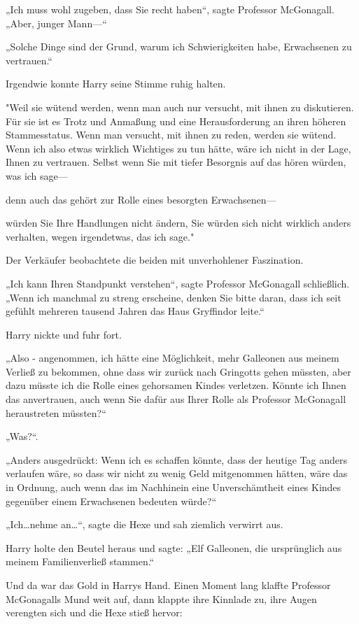 {„Ich muss wohl zugeben, dass Sie recht haben“, sagte Professor McGonagall. „Aber, junger Mann—“

„Solche Dinge sind der Grund, warum ich Schwierigkeiten habe, Erwachsenen zu vertrauen.“

Irgendwie konnte Harry seine Stimme ruhig halten.

"Weil sie wütend werden, wenn man auch nur versucht, mit ihnen zu diskutieren. Für sie ist es Trotz und Anmaßung und eine Herausforderung an ihren höheren Stammesstatus. Wenn man versucht, mit ihnen zu reden, werden sie wütend. Wenn ich also etwas wirklich Wichtiges zu tun hätte, wäre ich nicht in der Lage, Ihnen zu vertrauen. Selbst wenn Sie mit tiefer Besorgnis auf das hören würden, was ich sage—

denn auch das gehört zur Rolle eines besorgten Erwachsenen—

würden Sie Ihre Handlungen nicht ändern, Sie würden sich nicht wirklich anders verhalten, wegen irgendetwas, das ich sage."

Der Verkäufer beobachtete die beiden mit unverhohlener Faszination.

„Ich kann Ihren Standpunkt verstehen“, sagte Professor McGonagall schließlich. „Wenn ich manchmal zu streng erscheine, denken Sie bitte daran, dass ich seit gefühlt mehreren tausend Jahren das Haus Gryffindor leite.“

Harry nickte und fuhr fort.

„Also - angenommen, ich hätte eine Möglichkeit, mehr Galleonen aus meinem Verließ zu bekommen, ohne dass wir zurück nach Gringotts gehen müssten, aber dazu müsste ich die Rolle eines gehorsamen Kindes verletzen. Könnte ich Ihnen das anvertrauen, auch wenn Sie dafür aus Ihrer Rolle als Professor McGonagall heraustreten müssten?“

„Was?“.

„Anders ausgedrückt: Wenn ich es schaffen könnte, dass der heutige Tag anders verlaufen wäre, so dass wir nicht zu wenig Geld mitgenommen hätten, wäre das in Ordnung, auch wenn das im Nachhinein eine Unverschämtheit eines Kindes gegenüber einem Erwachsenen bedeuten würde?“

„Ich…nehme an…“, sagte die Hexe und sah ziemlich verwirrt aus.

Harry holte den Beutel heraus und sagte: „Elf Galleonen, die ursprünglich aus meinem Familienverließ stammen.“

Und da war das Gold in Harrys Hand. Einen Moment lang klaffte Professor McGonagalls Mund weit auf, dann klappte ihre Kinnlade zu, ihre Augen verengten sich und die Hexe stieß hervor:

}
